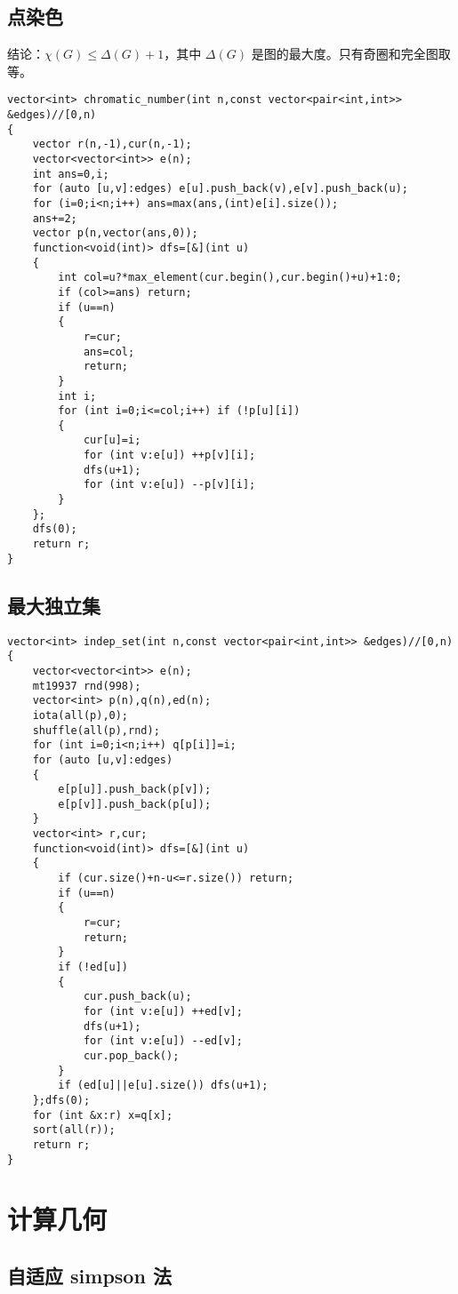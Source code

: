 \documentclass[12pt]{ctexart}
\begin{document}
\subsection{点染色}

结论：$\chi(G)\le \Delta(G)+1$，其中 $\Delta(G)$ 是图的最大度。只有奇圈和完全图取等。

\begin{lstlisting}
vector<int> chromatic_number(int n,const vector<pair<int,int>> &edges)//[0,n)
{
	vector r(n,-1),cur(n,-1);
	vector<vector<int>> e(n);
	int ans=0,i;
	for (auto [u,v]:edges) e[u].push_back(v),e[v].push_back(u);
	for (i=0;i<n;i++) ans=max(ans,(int)e[i].size());
	ans+=2;
	vector p(n,vector(ans,0));
	function<void(int)> dfs=[&](int u)
	{
		int col=u?*max_element(cur.begin(),cur.begin()+u)+1:0;
		if (col>=ans) return;
		if (u==n)
		{
			r=cur;
			ans=col;
			return;
		}
		int i;
		for (int i=0;i<=col;i++) if (!p[u][i])
		{
			cur[u]=i;
			for (int v:e[u]) ++p[v][i];
			dfs(u+1);
			for (int v:e[u]) --p[v][i];
		}
	};
	dfs(0);
	return r;
}
\end{lstlisting}

\subsection{最大独立集}

\begin{lstlisting}
vector<int> indep_set(int n,const vector<pair<int,int>> &edges)//[0,n)
{
	vector<vector<int>> e(n);
	mt19937 rnd(998);
	vector<int> p(n),q(n),ed(n);
	iota(all(p),0);
	shuffle(all(p),rnd);
	for (int i=0;i<n;i++) q[p[i]]=i;
	for (auto [u,v]:edges)
	{
		e[p[u]].push_back(p[v]);
		e[p[v]].push_back(p[u]);
	}
	vector<int> r,cur;
	function<void(int)> dfs=[&](int u)
	{
		if (cur.size()+n-u<=r.size()) return;
		if (u==n)
		{
			r=cur;
			return;
		}
		if (!ed[u])
		{
			cur.push_back(u);
			for (int v:e[u]) ++ed[v];
			dfs(u+1);
			for (int v:e[u]) --ed[v];
			cur.pop_back();
		}
		if (ed[u]||e[u].size()) dfs(u+1);
	};dfs(0);
	for (int &x:r) x=q[x];
	sort(all(r));
	return r;
}
\end{lstlisting}




\newpage

\section{计算几何}

\subsection{自适应 simpson 法}
\end{document}
